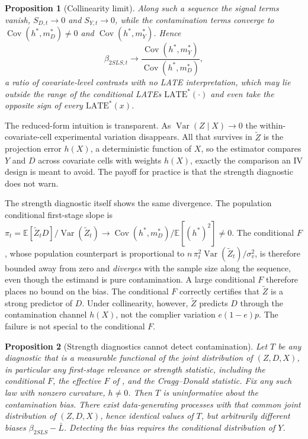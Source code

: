 \documentclass[11pt]{article}
\theoremstyle{plain}
\newtheorem{proposition}{Proposition}
\theoremstyle{definition}
\newcommand{\E}{\mathbb{E}}
\newcommand{\Cov}{\operatorname{Cov}}
\newcommand{\Var}{\operatorname{Var}}
\newcommand{\Lb}{\bar{L}}
\newcommand{\Zt}{\tilde{Z}}
\begin{document}
\begin{proposition}[Collinearity limit]\label{prop:collim}
Along such a sequence the signal terms vanish, $S_{D,t}\to 0$ and $S_{Y,t}\to 0$, while the contamination terms converge to $\Cov(h^\ast,m_D^\ast)\neq 0$ and $\Cov(h^\ast,m_Y^\ast)$. Hence
\[
\beta_{2SLS,t}\longrightarrow \frac{\Cov(h^\ast,m_Y^\ast)}{\Cov(h^\ast,m_D^\ast)},
\]
a ratio of covariate-level contrasts with no LATE interpretation, which may lie outside the range of the conditional LATEs $\mathrm{LATE}^\ast(\cdot)$ and even take the opposite sign of every $\mathrm{LATE}^\ast(x)$.
\end{proposition}

The reduced-form intuition is transparent. As $\Var(Z\mid X)\to 0$ the within-covariate-cell experimental variation disappears. All that survives in $\Zt$ is the projection error $h(X)$, a deterministic function of $X$, so the estimator compares $Y$ and $D$ across covariate cells with weights $h(X)$, exactly the comparison an IV design is meant to avoid. The payoff for practice is that the strength diagnostic does not warn.

The strength diagnostic itself shows the same divergence. The population \citet{sw2016} conditional first-stage slope is $\pi_t=\E[\Zt_t D]/\Var(\Zt_t)\to \Cov(h^\ast,m_D^\ast)/\E[(h^\ast)^2]\neq 0$. The conditional $F$, whose population counterpart is proportional to $n\,\pi_t^2\Var(\Zt_t)/\sigma_v^2$, is therefore bounded away from zero and \emph{diverges} with the sample size along the sequence, even though the estimand is pure contamination. A large conditional $F$ therefore places no bound on the bias. The conditional $F$ correctly certifies that $\Zt$ is a strong predictor of $D$. Under collinearity, however, $\Zt$ predicts $D$ through the contamination channel $h(X)$, not the complier variation $e(1-e)p$. The failure is not special to the conditional $F$.

\begin{proposition}[Strength diagnostics cannot detect contamination]\label{prop:imposs}
Let $T$ be any diagnostic that is a measurable functional of the joint distribution of $(Z,D,X)$, in particular any first-stage relevance or strength statistic, including the conditional $F$, the effective $F$ of \citet{mop2013}, and the Cragg--Donald statistic. Fix any such law with nonzero curvature, $h\neq 0$. Then $T$ is uninformative about the contamination bias. There exist data-generating processes with that common joint distribution of $(Z,D,X)$, hence identical values of $T$, but arbitrarily different biases $\beta_{2SLS}-\Lb$. Detecting the bias requires the conditional distribution of $Y$.
\end{proposition}
\end{document}
